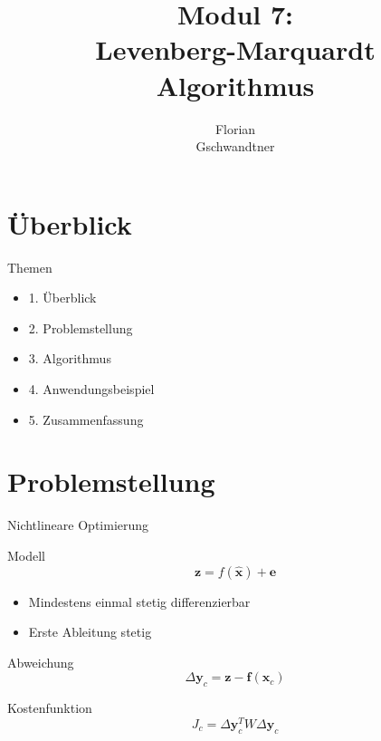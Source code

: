 \documentclass[8pt, t, aspectratio=169,%
]{beamer}
\title{Modul 7: \\ Levenberg-Marquardt \\ Algorithmus}
\author[Florian Gschwandtner]{Florian \\ Gschwandtner}
\institute{IFR}
\begin{document}
\begin{frame}[plain]
  \titlepage
\end{frame}


\section{Überblick} %

\begin{frame}{Themen}
	\begin{itemize}\huge
		\item[]	1. Überblick
		\item[] 2. Problemstellung
		\item[] 3. Algorithmus
		\item[] 4. Anwendungsbeispiel
		\item[] 5. Zusammenfassung
	\end{itemize}

\end{frame}


\section{Problemstellung}

\begin{frame}{Nichtlineare Optimierung}\LARGE

Modell
\begin{equation}
	\textbf{z} =  f(\hat{\textbf{x}})+\textbf{e}
\end{equation}

\begin{itemize}
	\item Mindestens einmal stetig differenzierbar
	\item Erste Ableitung stetig
\end{itemize}

Abweichung
\begin{equation}
	\Delta \textbf{y}_c = \textbf{z}-\textbf{f}(\textbf{x}_c)
\end{equation}\label{deltayc}


Kostenfunktion
\begin{equation}
	J_c = \Delta \textbf{y}_c^T W \Delta \textbf{y}_c
\end{equation}\label{jc}

\end{frame}
\end{document}
